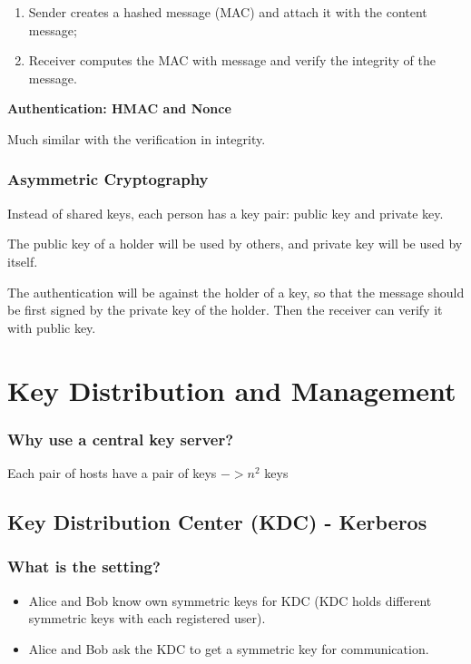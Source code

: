 \begin{enumerate}
    \item Sender creates a hashed message (MAC) and attach it with the content message;
    \item Receiver computes the MAC with message and verify the integrity of the message.
\end{enumerate}

\textbf{Authentication: HMAC and Nonce}

Much similar with the verification in integrity.


\subsubsection{Asymmetric Cryptography}
Instead of shared keys, each person has a key pair: public key and private key.

The public key of a holder will be used by others, and private key will be used by itself.

The authentication will be against the holder of a key, so that the message should be first signed by the private key of the holder. Then the receiver can verify it with public key.

\section{Key Distribution and Management}
\subsubsection{Why use a central key server?}
Each pair of hosts have a pair of keys $-> n^2$ keys

\subsection{Key Distribution Center (KDC) - Kerberos}
\subsubsection{What is the setting?}
\begin{itemize}
    \item Alice and Bob know own symmetric keys for KDC (KDC holds different symmetric keys with each registered user).
    \item Alice and Bob ask the KDC to get a symmetric key for communication.
\end{itemize}

